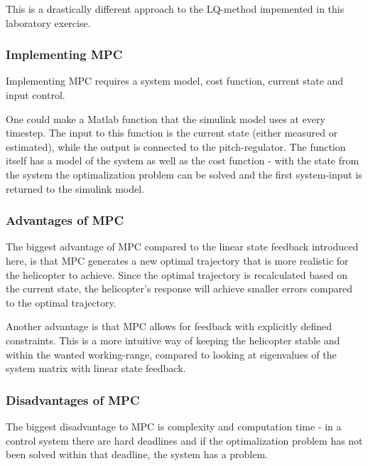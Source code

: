 \documentclass[../main.tex]{subfiles}
\begin{document}
This is a drastically different approach to the LQ-method impemented in this laboratory exercise.

\subsubsection{Implementing MPC}
Implementing MPC requires a system model, cost function, current state and input control.

One could make a Matlab function that the simulink model uses at every timestep. The input to this function is the current state (either measured or estimated), while the output is connected to the pitch-regulator. The function itself has a model of the system as well as the cost function - with the state from the system the optimalization problem can be solved and the first system-input is returned to the simulink model. 

\subsubsection{Advantages of MPC}
The biggest advantage of MPC compared to the linear state feedback introduced here, is that MPC generates a new optimal trajectory that is more realistic for the helicopter to achieve. Since the optimal trajectory is recalculated based on the current state, the helicopter's response will achieve smaller errors compared to the optimal trajectory. 


Another advantage is that MPC allows for feedback with explicitly defined constraints. This is a more intuitive way of keeping the helicopter stable and within the wanted working-range, compared to looking at eigenvalues of the system matrix with linear state feedback.

\subsubsection{Disadvantages of MPC}
The biggest disadvantage to MPC is complexity and computation time - in a control system there are hard deadlines and if the optimalization problem has not been solved within that deadline, the system has a problem.
\end{document}
